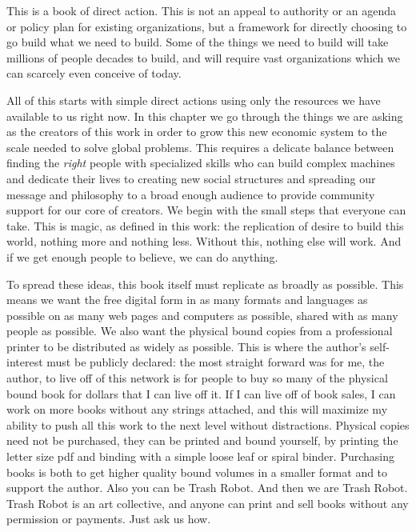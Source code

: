 
This is a book of direct action. This is not an appeal to authority or
an agenda or policy plan for existing organizations, but a framework for
directly choosing to go build what we need to build. Some of the things
we need to build will take millions of people decades to build, and will
require vast organizations which we can scarcely even conceive of today.

All of this starts with simple direct actions using only the resources
we have available to us right now. In this chapter we go through the
things we are asking as the creators of this work in order to grow this
new economic system to the scale needed to solve global problems. This
requires a delicate balance between finding the \emph{right} people with
specialized skills who can build complex machines and dedicate their
lives to creating new social structures and spreading our message and
philosophy to a broad enough audience to provide community support for
our core of creators. We begin with the small steps that everyone can
take. This is magic, as defined in this work: the replication of desire
to build this world, nothing more and nothing less. Without this,
nothing else will work. And if we get enough people to believe, we can
do anything.

To spread these ideas, this book itself must replicate as broadly as
possible. This means we want the free digital form in as many formats
and languages as possible on as many web pages and computers as
possible, shared with as many people as possible. We also want the
physical bound copies from a professional printer to be distributed as
widely as possible. This is where the author's self-interest must be
publicly declared: the most straight forward was for me, the author, to
live off of this network is for people to buy so many of the physical
bound book for dollars that I can live off it. If I can live off of book
sales, I can work on more books without any strings attached, and this
will maximize my ability to push all this work to the next level without
distractions. Physical copies need not be purchased, they can be printed
and bound yourself, by printing the letter size pdf and binding with a
simple loose leaf or spiral binder. Purchasing books is both to get
higher quality bound volumes in a smaller format and to support the
author. Also you can be Trash Robot. And then we are Trash Robot. Trash
Robot is an art collective, and anyone can print and sell books without
any permission or payments. Just ask us how.


